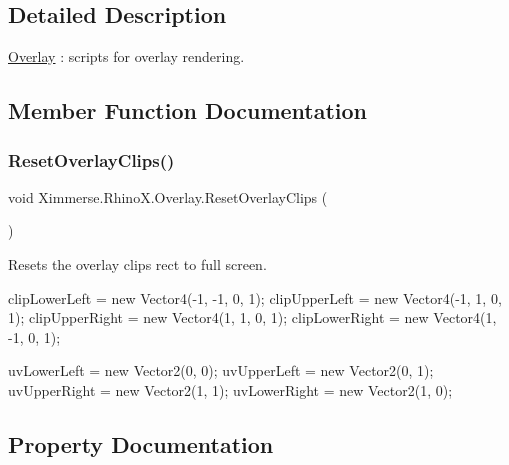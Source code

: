 \subsection{Detailed Description}
\mbox{\hyperlink{class_ximmerse_1_1_rhino_x_1_1_overlay}{Overlay}} \+: scripts for overlay rendering. 



\subsection{Member Function Documentation}
\mbox{\label{class_ximmerse_1_1_rhino_x_1_1_overlay_a4fffeab006cc47fe53a3dbe2a4df7331}} 
\subsubsection{\texorpdfstring{Reset\+Overlay\+Clips()}{ResetOverlayClips()}}
{\footnotesize\ttfamily void Ximmerse.\+Rhino\+X.\+Overlay.\+Reset\+Overlay\+Clips (\begin{DoxyParamCaption}{ }\end{DoxyParamCaption})}



Resets the overlay clips rect to full screen. 

clip\+Lower\+Left = new Vector4(-\/1, -\/1, 0, 1); clip\+Upper\+Left = new Vector4(-\/1, 1, 0, 1); clip\+Upper\+Right = new Vector4(1, 1, 0, 1); clip\+Lower\+Right = new Vector4(1, -\/1, 0, 1);

uv\+Lower\+Left = new Vector2(0, 0); uv\+Upper\+Left = new Vector2(0, 1); uv\+Upper\+Right = new Vector2(1, 1); uv\+Lower\+Right = new Vector2(1, 0);

\subsection{Property Documentation}
\mbox{\label{class_ximmerse_1_1_rhino_x_1_1_overlay_a33625bf90415d02965199b48bbaec4cc}} 
